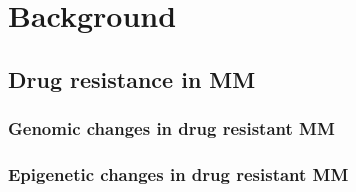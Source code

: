 \chapter{\label{ch:2-litreview}Background}



\section{Drug resistance in MM}


\subsection{Genomic changes in drug resistant MM}


\subsection{Epigenetic changes in drug resistant MM}




